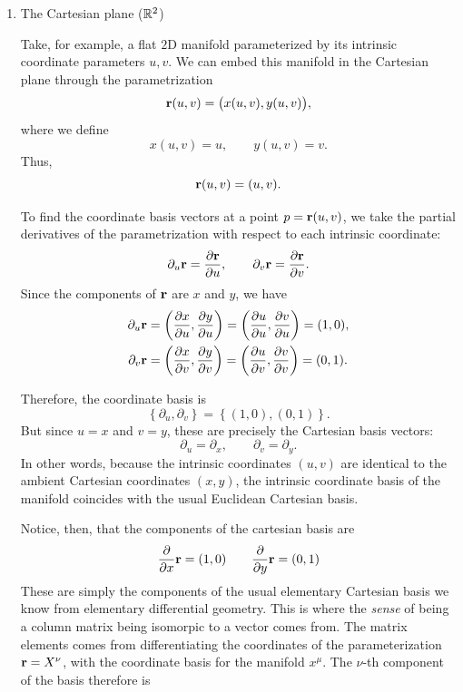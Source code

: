 		\begin{enumerate}[(1)]
			\item The Cartesian plane ($\mathbb{R}^2$)

				Take, for example, a flat $2$D manifold parameterized by its
				intrinsic coordinate parameters $u,v$. We can embed this manifold
				in the Cartesian plane through the parametrization
				\[
					\vb{r}(u,v)
					=
					\bigl(x(u,v),y(u,v)\bigr),
				\]
				where we define
				\[
					x(u,v)=u,
					\qquad
					y(u,v)=v.
				\]
				Thus,
				\[
					\vb{r}(u,v)=(u,v).
				\]

				To find the coordinate basis vectors at a point
				$p=\vb{r}(u,v)$, we take the partial derivatives of the
				parametrization with respect to each intrinsic coordinate:
				\[
					\partial_u\vb{r}
					=
					\pdv{\vb{r}}{u},
					\qquad
					\partial_v\vb{r}
					=
					\pdv{\vb{r}}{v}.
				\]
				Since the components of $\vb{r}$ are $x$ and $y$, we have
				\begin{align*}
					\partial_u\vb{r}
					&=
					\pqty{
						\pdv{x}{u},
						\pdv{y}{u}
					}
					=
					\pqty{
						\pdv{u}{u},
						\pdv{v}{u}
					}
					=
					(1,0),
					\\
					\partial_v\vb{r}
					&=
					\pqty{
						\pdv{x}{v},
						\pdv{y}{v}
					}
					=
					\pqty{
						\pdv{u}{v},
						\pdv{v}{v}
					}
					=
					(0,1).
				\end{align*}

				Therefore, the coordinate basis is
				\[
					\left\{
						\partial_u,\partial_v
					\right\}
					=
					\left\{
						(1,0),(0,1)
					\right\}.
				\]
				But since $u=x$ and $v=y$, these are precisely the Cartesian
				basis vectors:
				\[
					{
						\partial_u=\partial_x,
						\qquad
						\partial_v=\partial_y.
					}
				\]
				In other words, because the intrinsic coordinates $(u,v)$ are
				identical to the ambient Cartesian coordinates $(x,y)$, the
				intrinsic coordinate basis of the manifold coincides with the
				usual Euclidean Cartesian basis.

				Notice, then, that the components of the cartesian basis are 
				\[
					\pdv{}{x}\vb{r} = (1,0) \qquad \pdv{}{y} \vb{r} = (0,1)
				\]
				These are simply the components of the usual elementary Cartesian
				basis we know from elementary differential geometry. This is where the 
				\textit{sense} of being a column matrix being isomorpic to a vector comes 
				from. The matrix elements comes from differentiating the coordinates of 
				the parameterization $\vb{r} = X^\nu$, with the coordinate basis for the manifold
				$x^\mu$. The $\nu$-th component of the basis therefore is


\end{enumerate}
